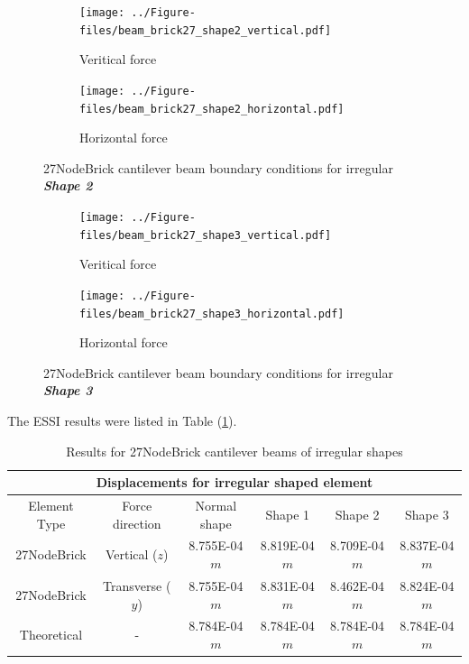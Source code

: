 \documentclass[fleqn,11pt]{article}
\begin{document}
\begin{figure}[H]
  \centering
    \begin{subfigure}{0.5\textwidth}
      \centering
      \texttt{[image: ../Figure-files/beam\_brick27\_shape2\_vertical.pdf]}
      \caption{Veritical force}
    \end{subfigure}
    \begin{subfigure}{0.5\textwidth}
      \centering
      \texttt{[image: ../Figure-files/beam\_brick27\_shape2\_horizontal.pdf]}
      \caption{Horizontal force}
    \end{subfigure}
  \caption{27NodeBrick cantilever beam boundary conditions for irregular \textbf{\emph{Shape 2}} }
  \label{fig 27NodeBrick cantilever beam boundary conditions shape 2}
\end{figure}


\begin{figure}[H]
  \centering
    \begin{subfigure}{0.5\textwidth}
      \centering
      \texttt{[image: ../Figure-files/beam\_brick27\_shape3\_vertical.pdf]}
      \caption{Veritical force}
    \end{subfigure}
    \begin{subfigure}{0.5\textwidth}
      \centering
      \texttt{[image: ../Figure-files/beam\_brick27\_shape3\_horizontal.pdf]}
      \caption{Horizontal force}
    \end{subfigure}
  \caption{27NodeBrick cantilever beam boundary conditions for irregular \textbf{\emph{Shape 3}} }
  \label{fig 27NodeBrick cantilever beam boundary conditions shape 3}
\end{figure}


The ESSI results were listed in Table (\ref{table Results for 27NodeBrick cantilever beams of irregular shapes}). 
\begin{table}[H]
  \centering
  \caption{Results for 27NodeBrick cantilever beams of irregular shapes}
  \label{table Results for 27NodeBrick cantilever beams of irregular shapes}
  \begin{tabular}{|c|c|c|c|c|c|}
    \hline 
    \multicolumn{6}{|c|}{Displacements for irregular shaped element}   \\ \hline
    Element Type   & Force direction & Normal shape & Shape 1 & Shape 2 & Shape 3  \\ \hline 
    27NodeBrick     & Vertical ($z$)     & 8.755E-04 $m$  & 8.819E-04 $m$ & 8.709E-04 $m$ & 8.837E-04 $m$   \\ \hline
    27NodeBrick     & Transverse ($y$)   & 8.755E-04 $m$  & 8.831E-04 $m$ & 8.462E-04 $m$ & 8.824E-04 $m$   \\ \hline
    Theoretical    &      -              & 8.784E-04 $m$  & 8.784E-04 $m$ & 8.784E-04 $m$ & 8.784E-04 $m$ \\ \hline
  \end{tabular}
\end{table}
\end{document}
